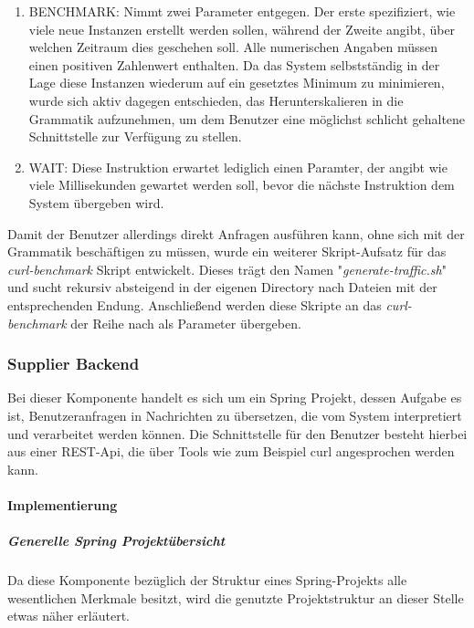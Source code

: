 \begin{enumerate}
  \item BENCHMARK: Nimmt zwei Parameter entgegen. Der erste spezifiziert, wie viele neue Instanzen erstellt werden sollen, während der Zweite angibt, über welchen Zeitraum dies geschehen soll. Alle numerischen Angaben müssen einen positiven Zahlenwert enthalten. Da das System selbstständig in der Lage diese Instanzen wiederum auf ein gesetztes Minimum zu minimieren, wurde sich aktiv dagegen entschieden, das Herunterskalieren in die Grammatik aufzunehmen, um dem Benutzer eine möglichst schlicht gehaltene Schnittstelle zur Verfügung zu stellen.
  \item WAIT: Diese Instruktion erwartet lediglich einen Paramter, der angibt wie viele Millisekunden gewartet werden soll, bevor die nächste Instruktion dem System übergeben wird. 
\end{enumerate}


Damit der Benutzer allerdings direkt Anfragen ausführen kann, ohne sich mit der Grammatik beschäftigen zu müssen, wurde ein weiterer Skript-Aufsatz 
für das \emph{curl-benchmark} Skript entwickelt. Dieses trägt den Namen "\emph{generate-traffic.sh}" und sucht rekursiv absteigend in der eigenen Directory nach Dateien mit der entsprechenden Endung. Anschließend werden diese Skripte an das \emph{curl-benchmark} der Reihe nach als Parameter übergeben.





\subsubsection{Supplier Backend}
Bei dieser Komponente handelt es sich um ein Spring Projekt, dessen Aufgabe es ist, Benutzeranfragen in Nachrichten zu übersetzen, die vom System interpretiert und verarbeitet werden können. Die Schnittstelle für den Benutzer besteht hierbei aus einer REST-Api, die über Tools wie zum Beispiel curl angesprochen werden kann.


\paragraph{Implementierung}

\subparagraph{Generelle Spring Projektübersicht}
Da diese Komponente bezüglich der Struktur eines Spring-Projekts alle wesentlichen Merkmale besitzt, wird die genutzte Projektstruktur an dieser Stelle etwas näher erläutert. 

